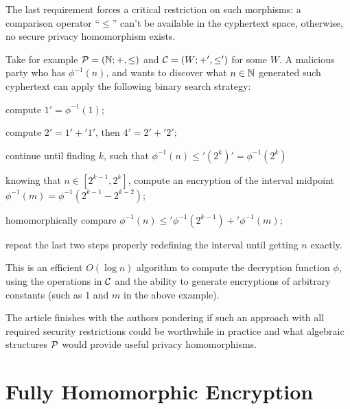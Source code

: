 The last requirement forces a critical restriction on such morphisms: a comparison operator ``$\leq$'' can't be available in the cyphertext space, otherwise, no secure privacy homomorphism exists.

Take for example $\mathcal P = (\mathbb{N};+,\leq)$ and $\mathcal C = (W;+',\leq')$ for some $W$. A malicious party who has $\phi^{-1}(n)$, and wants to discover what $n\in\mathbb{N}$ generated such cyphertext can apply the following binary search strategy:
\begin{alineas}
\item compute $1'=\phi^{-1}(1)$;
\item compute $2'=1'+'1'$, then $4'=2'+'2'$;
\item continue until finding $k$, such that $\phi^{-1}(n)\leq'(2^k)'=\phi^{-1}(2^k)$
\item knowing that $n\in[2^{k-1},2^{k}]$, compute an encryption of the interval midpoint $\phi^{-1}(m)=\phi^{-1}(2^{k-1}-2^{k-2})$;
\item homomorphically compare $\phi^{-1}(n)\leq'\phi^{-1}(2^{k-1})+'\phi^{-1}(m)$;
\item repeat the last two steps properly redefining the interval until getting $n$ exactly.
\end{alineas}
This is an efficient $O(\log n)$ algorithm to compute the decryption function $\phi$, using the operations in $\mathcal C$ and the ability to generate encryptions of arbitrary constants (such as $1$ and $m$ in the above example).

The article finishes with the authors pondering if such an approach with all required security restrictions could be worthwhile in practice and what algebraic structures $\mathcal P$ would provide useful privacy homomorphisms.

\section{Fully Homomorphic Encryption}
